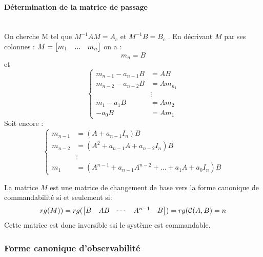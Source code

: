 \documentclass[main.tex]{subfiles}
\begin{document}
\paragraph{Détermination de la matrice de passage}~\\
On cherche M tel que $M^{-1}AM = A_c $ et $ M^{-1}B = B_c$ . En décrivant $M$ par ses colonnes : $M =\begin{bmatrix}  m_1 & ... & m_n \end{bmatrix}$ on a :
\[
m_n = B
\]
et \[\left\{
  \begin{array}{rl}
    m_{n-1}-a_{n-1}B &= AB \\
    m_{n-2}-a_{n-2}B &= Am_{n_1}\\
    &\vdots\\
    m_1- a_1 B &= A m_2\\
    -a_0B &= Am_1
  \end{array}\right.
\]
Soit encore :
\[
  \begin{cases}
    m_{n-1} &= (A+a_{n-1}I_n)B \\
    m_{n-2} &= (A^2+a_{n-1}A +a_{n-2}I_n)B \\
&\vdots\\
      m_{1}  &= (A^{n-1}+a_{n-1}A^{n-2}+ ... + a_1A + a_0 I_n)B
  \end{cases}
\]
\begin{prop}
  La matrice $M$ est une matrice de changement de base vers la forme canonique de commandabilité si et seulement si:
   \[
     rg(M)) = rg(\begin{bmatrix} B & AB & \cdots & A^{n-1} &B \end{bmatrix}) =rg(\mathcal{C}(A,B) = n
   \]
   Cette matrice est donc inversible ssi le système est commandable.
\end{prop}



\subsubsection{Forme canonique d'observabilité}
\end{document}
